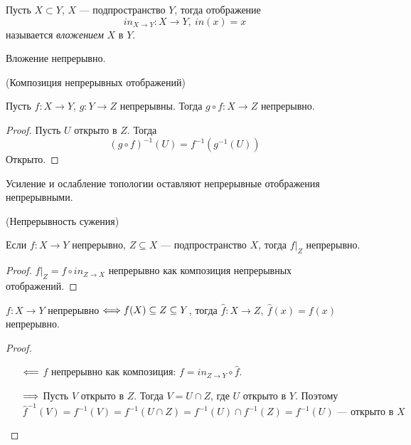 \begin{definition}
	Пусть $X \subset Y$, $X$ --- подпространство $Y$,
	тогда отображение
\[
	in_{X \to Y} \colon X \to Y, ~in(x) = x
\]
	называется \textit{вложением} $X$ в $Y$.
\end{definition}

\begin{remark}
	Вложение непрерывно.
\end{remark}

\begin{theorem}(Композиция непрерывных отображений)

	Пусть $f \colon X \to Y$, $g \colon Y \to Z$ непрерывны. Тогда
	$g \circ f \colon X \to Z$ непрерывно.
\end{theorem}
\begin{proof}
	Пусть $U$ открыто в $Z$. Тогда
\[
	(g \circ f)^{-1}(U) = f^{-1}(g^{-1}(U))
\]
	Открыто.
\end{proof}

\begin{remark}
	Усиление и ослабление топологии оставляют непрерывные отображения непрерывными.
\end{remark}

\begin{theorem}(Непрерывность сужения)

	Если $f \colon X \to Y$ непрерывно, $Z \subseteq X$ --- подпространство $X$,
	тогда $f\big|_Z$ непрерывно.
\end{theorem}
\begin{proof}
	$f\big|_Z = f \circ in_{Z \to X}$ непрерывно как композиция непрерывных отображений.
\end{proof}

\begin{theorem}

	$f \colon X \to Y$ непрерывно $\Longleftrightarrow f(X) \subseteq Z \subseteq Y$,
	тогда $\hat{f} \colon X \to Z,~ \hat{f}(x) = f(x)$ непрерывно.
\end{theorem}
\begin{proof}
	\enewline
	\begin{itemize}
		\item[$\Longleftarrow$] $f$ непрерывно как композиция: $f =
			in_{Z \to Y} \circ \hat{f}$.
		\item[$\Longrightarrow$] Пусть $V$ открыто в $Z$. Тогда $V = U \cap Z$, где $U$
			открыто в $Y$. Поэтому
\[
	\hat{f}^{-1}(V) = f^{-1}(V) = f^{-1}(U \cap Z) = f^{-1}(U) \cap f^{-1}(Z)
	= f^{-1}(U) \text{ --- открыто в } X
\]
	\end{itemize}
\end{proof}

